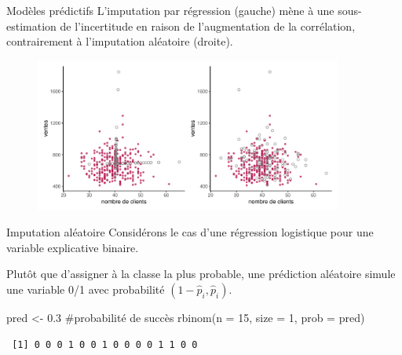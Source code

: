 \documentclass[
  ignorenonframetext,
]{beamer}
\newenvironment{Shaded}{\begin{snugshade}}{\end{snugshade}}
\newcommand{\AttributeTok}[1]{\textcolor[rgb]{0.40,0.45,0.13}{#1}}
\newcommand{\CommentTok}[1]{\textcolor[rgb]{0.37,0.37,0.37}{#1}}
\newcommand{\DecValTok}[1]{\textcolor[rgb]{0.68,0.00,0.00}{#1}}
\newcommand{\FloatTok}[1]{\textcolor[rgb]{0.68,0.00,0.00}{#1}}
\newcommand{\FunctionTok}[1]{\textcolor[rgb]{0.28,0.35,0.67}{#1}}
\newcommand{\NormalTok}[1]{\textcolor[rgb]{0.00,0.23,0.31}{#1}}
\newcommand{\OtherTok}[1]{\textcolor[rgb]{0.00,0.23,0.31}{#1}}
\begin{document}
\begin{frame}{Modèles prédictifs}
\protect\hypertarget{moduxe8les-pruxe9dictifs}{}
L'imputation par régression (gauche) mène à une sous-estimation de
l'incertitude en raison de l'augmentation de la corrélation,
contrairement à l'imputation aléatoire (droite).

\begin{figure}

{\centering \includegraphics[width=0.9\textwidth,height=\textheight]{MATH60602-diapos13_files/figure-beamer/unnamed-chunk-3-1.pdf}

}

\end{figure}
\end{frame}

\begin{frame}[fragile]{Imputation aléatoire}
\protect\hypertarget{imputation-aluxe9atoire}{}
Considérons le cas d'une régression logistique pour une variable
explicative binaire.

Plutôt que d'assigner à la classe la plus probable, une prédiction
aléatoire simule une variable 0/1 avec probabilité
\((1-\widehat{p}_i, \widehat{p}_i)\).

\begin{Shaded}
\begin{Highlighting}[numbers=left,,]
\NormalTok{pred }\OtherTok{\textless{}{-}} \FloatTok{0.3} \CommentTok{\#probabilité de succès}
\FunctionTok{rbinom}\NormalTok{(}\AttributeTok{n =} \DecValTok{15}\NormalTok{, }\AttributeTok{size =} \DecValTok{1}\NormalTok{, }\AttributeTok{prob =}\NormalTok{ pred)}
\end{Highlighting}
\end{Shaded}

\begin{verbatim}
 [1] 0 0 0 1 0 0 1 0 0 0 0 1 1 0 0
\end{verbatim}
\end{frame}
\end{document}
